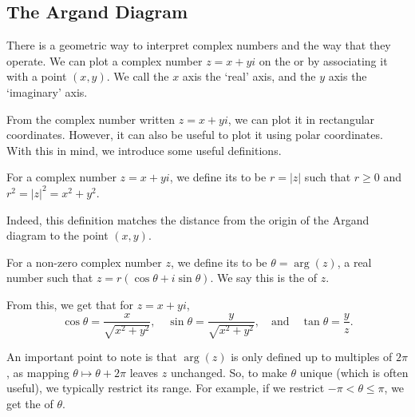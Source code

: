 \documentclass[a4paper]{scrreprt}
\begin{document}
\subsection{The Argand Diagram}

There is a geometric way to interpret complex numbers and the way that they operate. We can plot a complex number $z = x + yi$ on the  or  by associating it with a point $(x, y)$. We call the $x$ axis the `real' axis, and the $y$ axis the `imaginary' axis.

\begin{center}
\end{center}

From the complex number written $z= x + yi$, we can plot it in rectangular coordinates. However, it can also be useful to plot it using polar coordinates. With this in mind, we introduce some useful 
definitions.

\begin{definition}[Modulus]
	For a complex number $z = x + yi$, we define its  to be $r = |z|$ such that $r \geq 0$ and $r^2 = |z|^2 = x^2 + y^2$.
\end{definition}

Indeed, this definition matches the distance from the origin of the Argand diagram to the point $(x, y)$.

\begin{definition}[Argument]
	For a non-zero complex number $z$, we define its  to be $\theta = \arg(z)$, a real number such that $z = r(\cos \theta + i \sin \theta)$. We say this is the  of $z$.
\end{definition}

From this, we get that for $z = x + yi$,
$$
\cos \theta = \frac{x}{\sqrt{x^2 + y^2}}, \quad \sin \theta = \frac{y}{\sqrt{x^2 + y^2}}, \quad \text{and} \quad \tan \theta = \frac{y}{z}.
$$

An important point to note is that $\arg(z)$ is only defined up to multiples of $2 \pi$, as mapping $\theta \mapsto \theta + 2\pi$ leaves $z$ unchanged. So, to make $\theta$ unique (which is often useful), we typically restrict its range. For example, if we restrict $- \pi < \theta \leq \pi$, we get the  of $\theta$.
\end{document}
